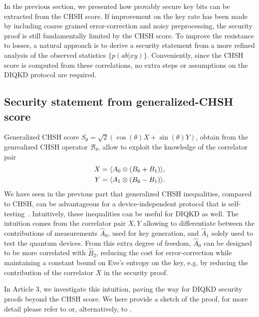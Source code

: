 In the previous section, we presented how provably secure key bits can be extracted from the CHSH score.
If improvement on the key rate has been made by including coarse grained error-correction and noisy preprocessing, the security proof is still fundamentally limited by the CHSH score.
To improve the resistance to losses, a natural approach is to derive a security statement from a more refined analysis of the observed statistics $\{p(ab|xy)\}$.
Conveniently, since the CHSH score is computed from these correlations, no extra steps or assumptions on the DIQKD protocol are required. 

\subsection{Security statement from generalized-CHSH score}
\label{sec:Pavel}

Generalized CHSH score $S_\theta=\sqrt{2}(\cos(\theta)X+\sin(\theta)Y)$, obtain from the genrealized CHSH operator $\mathcal{B}_\theta$, allow to exploit the knowledge of the correlator pair
\begin{equation}
	\begin{split}
		X = \langle {A_0 \otimes (B_0+B_1)} \rangle,\\
		Y = \langle {A_1 \otimes (B_0-B_1)} \rangle.
	\end{split}
\end{equation}
We have seen in the previous part that generalized CHSH inequalities, compared to CHSH, can be advantageous for a device-independent protocol that is self-testing~\cite{Valcarce2022}.
Intuitively, these inequalities can be useful for DIQKD as well.
The intuition comes from the correlator pair $X,Y$ allowing to differentiate between the contributions of measurements $\hat{A}_0$, used for key generation, and $\hat{A}_1$ solely used to test the quantum devices.
From this extra degree of freedom, $\hat{A}_0$ can be designed to be more correlated with $\hat{B}_2$, reducing the cost for error-correction while maintaining a constant bound on Eve's entropy on the key, e.g. by reducing the contribution of the correlator $X$ in the security proof.

In Article 3, we investigate this intuition, paving the way for DIQKD security proofs beyond the CHSH score. 
We here provide a sketch of the proof, for more detail please refer to \cite{Sekatski2021} or, alternatively, to \cite{Woodhead2021}.


\medbreak

